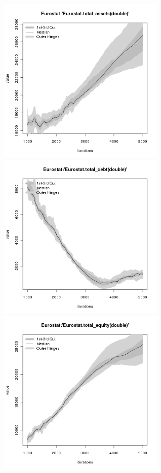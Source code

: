 \begin{figure}[H!]
\centering\leavevmode
\begin{minipage}{17cm}
\centering\leavevmode
\includegraphics[width=8cm]{./png/tax_0.10/Eurostat-total_assets.png}
\includegraphics[width=8cm]{./png/tax_0.10/Eurostat-total_debt.png}\\
\includegraphics[width=8cm]{./png/tax_0.10/Eurostat-total_equity.png}

\end{minipage}
\end{figure}
